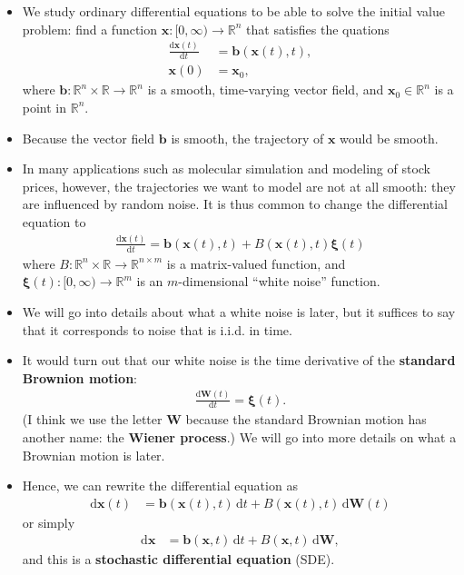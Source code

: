 \documentclass[10pt]{article}
\newcommand{\dee}{\mathrm{d}}
\newcommand{\ve}[1]{\mathbf{#1}}
\newcommand{\ves}[1]{\boldsymbol{#1}}
\newcommand{\Real}{\mathbb{R}}
\begin{document}
\begin{itemize}
  \item We study ordinary differential equations to be able to solve the initial value problem: find a function $\ve{x}: [0,\infty) \rightarrow \Real^n$ that satisfies the quations
  \begin{align*}
    \frac{ \dee \ve{x}(t) }{\dee t} &= \ve{b}(\ve{x}(t), t), \\
    \ve{x}(0) &= \ve{x}_0,
  \end{align*}
  where $\ve{b}: \Real^n \times \Real \rightarrow \Real^n$ is a smooth, time-varying vector field, and $\ve{x}_0 \in \Real^n$ is a point in $\Real^n$.

  \item Because the vector field $\ve{b}$ is smooth, the trajectory of $\ve{x}$ would be smooth.
  
  \item In many applications such as molecular simulation and modeling of stock prices, however, the trajectories we want to model are not at all smooth: they are influenced by random noise. It is thus common to change the differential equation to
  \begin{align*}
    \frac{\dee\ve{x}(t)}{\dee t} = \ve{b}(\ve{x}(t), t) + B(\ve{x}(t), t)\ves{\xi}(t)
  \end{align*}
  where $B: \Real^n \times \Real \rightarrow \Real^{n \times m}$ is a matrix-valued function, and $\ves{\xi}(t): [0,\infty) \rightarrow \Real^m$ is an $m$-dimensional ``white noise'' function.

  \item We will go into details about what a white noise is later, but it suffices to say that it corresponds to noise that is i.i.d. in time.
  
  \item It would turn out that our white noise is the time derivative of the {\bf standard Brownion motion}:
  \begin{align*}
    \frac{\dee\ve{W}(t)}{\dee t} = \ves{\xi}(t).
  \end{align*}
  (I think we use the letter $\ve{W}$ because the standard Brownian motion has another name: the {\bf Wiener process}.) We will go into more details on what a Brownian motion is later.

  \item Hence, we can rewrite the differential equation as
  \begin{align}
    \dee\ve{x}(t) &= \ve{b}(\ve{x}(t), t)\, \dee t + B(\ve{x}(t), t)\, \dee\ve{W}(t) \label{eqn:sde}
  \end{align}
  or simply
  \begin{align*}
    \dee\ve{x} &= \ve{b}(\ve{x},t)\, \dee t + B(\ve{x},t)\, \dee\ve{W}, 
  \end{align*}
  and this is a {\bf stochastic differential equation} (SDE).


\end{itemize}
\end{document}
